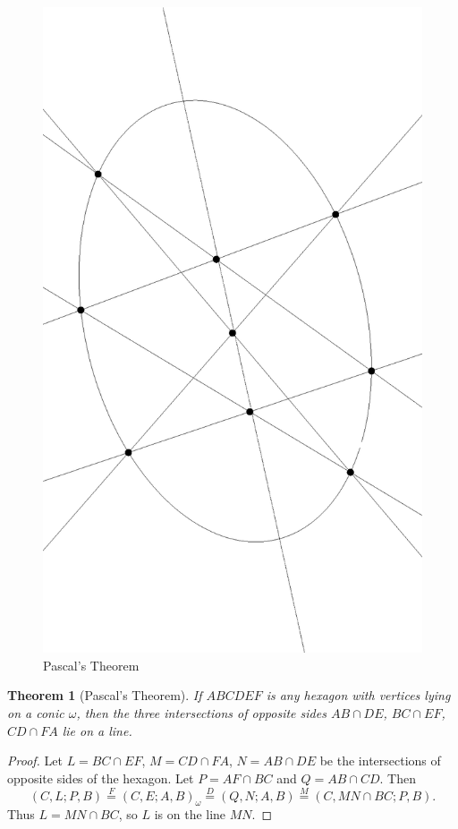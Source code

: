 \documentclass[letterpaper,11pt]{article}
\newtheorem{thm}{Theorem}
\theoremstyle{definition}
\theoremstyle{remark}
\begin{document}
\begin{figure}[!htb]
\centering
\includegraphics[scale=.5,angle=90]{pascal.eps}
\caption{Pascal's Theorem}
\end{figure}

\begin{thm}[Pascal's Theorem] If $ABCDEF$ is any hexagon with vertices lying on a conic $\omega$, then the three intersections of opposite sides $AB\cap DE$, $BC\cap EF$, $CD\cap FA$ lie on a line.
\end{thm}
\begin{proof} Let $L = BC\cap EF$, $M = CD\cap FA$, $N = AB\cap DE$ be the intersections of opposite sides of the hexagon. Let $P = AF\cap BC$ and $Q = AB\cap CD$. Then
\[
(C,L;P,B) \stackrel{F}{=} (C,E;A,B)_{\omega} \stackrel{D}{=} (Q,N;A,B) \stackrel{M}{=} (C,MN\cap BC;P,B).
\]
Thus $L = MN\cap BC$, so $L$ is on the line $MN$.
\end{proof}
\end{document}
